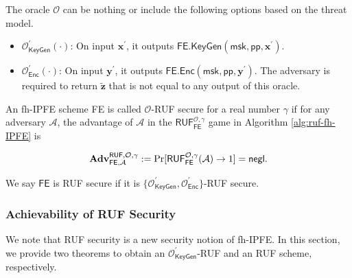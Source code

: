 The oracle $\mathcal{O}$ can be nothing or include the following options based on the threat model.

\begin{itemize}

	\item $\mathcal{O}^\prime_{\textsf{KeyGen}}(\cdot)$: On input $\mathbf{x}^\prime$, it outputs $\textsf{FE.KeyGen}(\textsf{msk}, \textsf{pp}, \mathbf{x}^\prime)$.
	
	\item $\mathcal{O}^\prime_{\textsf{Enc}}(\cdot)$: On input $\mathbf{y}^\prime$, it outputs $\textsf{FE.Enc}(\textsf{msk}, \textsf{pp}, \mathbf{y}^\prime)$. The adversary is required to return $\mathbf{\tilde{z}}$ that is not equal to any output of this oracle.
\end{itemize}

\begin{definition}

	An fh-IPFE scheme \textsf{FE} is called $\mathcal{O}$-RUF secure for a real number $\gamma$ if for any adversary $\mathcal{A}$, the advantage of $\mathcal{A}$ in the $\textsf{RUF}^{\mathcal{O}, \gamma}_\textsf{FE}$ game in Algorithm \ref{alg:ruf-fh-IPFE} is

\[
	\mathbf{Adv}_{\textsf{FE}, \mathcal{A}}^{\textsf{RUF}, \mathcal{O}, \gamma} := \Pr[\textsf{RUF}^{\mathcal{O}, \gamma}_{\textsf{FE}}(\mathcal{A}) \to 1 ] = \mathsf{negl}.
\]

\noindent We say $\textsf{FE}$ is RUF secure if it is $\{ \mathcal{O}^\prime_{\textsf{KeyGen}}, \mathcal{O}^\prime_{\textsf{Enc}} \}$-RUF secure.

\end{definition}


\subsubsection{Achievability of RUF Security}

We note that RUF security is a new security notion of fh-IPFE. In this section, we provide two theorems to obtain an $\mathcal{O}^\prime_{\textsf{KeyGen}}$-RUF and an RUF scheme, respectively.

